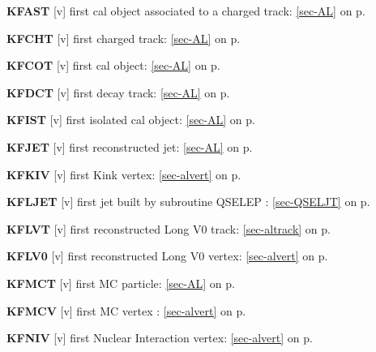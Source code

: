  \item{\bf KFAST   }[v] first cal object associated to a charged
 track:
 \ref{sec-AL} on p.~\pageref{sec-AL}\\
 \item{\bf KFCHT   }[v] first charged track: \ref{sec-AL} on p.~\pageref{sec-AL}\\
 \item{\bf KFCOT   }[v] first cal object: \ref{sec-AL} on p.~\pageref{sec-AL}\\
 \item{\bf KFDCT   }[v] first decay track: \ref{sec-AL} on p.~\pageref{sec-AL}\\
 \item{\bf KFIST   }[v] first isolated cal object: \ref{sec-AL} on p.~\pageref{sec-AL}\\
 \item{\bf KFJET   }[v] first reconstructed jet: \ref{sec-AL} on p.~\pageref{sec-AL}\\
 \item{\bf KFKIV   }[v] first Kink vertex: \ref{sec-alvert} on p.~\pageref{sec-alvert}\\
 \item{\bf KFLJET  }[v] first jet built by subroutine QSELEP : \ref{sec-QSELJT} on p.~\pageref{sec-QSELJT}  \\
 \item{\bf KFLVT   }[v] first reconstructed Long V0 track: \ref{sec-altrack} on p.~\pageref{sec-altrack}\\
 \item{\bf KFLV0   }[v] first reconstructed Long V0 vertex: \ref{sec-alvert} on p.~\pageref{sec-alvert}
 
 \item{\bf KFMCT   }[v] first MC particle: \ref{sec-AL} on p.~\pageref{sec-AL}\\
 \item{\bf KFMCV   }[v] first MC vertex  : \ref{sec-alvert} on p.~\pageref{sec-alvert}\\
 \item{\bf KFNIV   }[v] first Nuclear Interaction vertex: \ref{sec-alvert} on p.~\pageref{sec-alvert}
 
